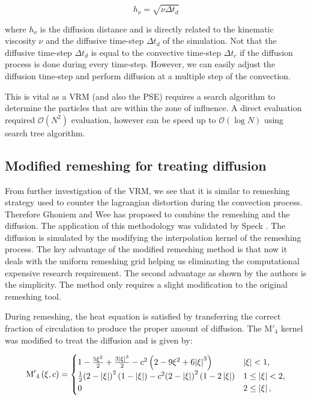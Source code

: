 	\begin{equation}
	h_{\nu} = \sqrt{\nu\Delta t_d}
	\end{equation}

where $h_{\nu}$ is the diffusion distance and is directly related to the kinematic viscosity $\nu$ and the diffusive time-step $\Delta t_d$ of the simulation. Not that the diffusive time-step $\Delta t_d$ is equal to the convective time-step $\Delta t_c$ if the diffusion process is done during every time-step. However, we can easily adjust the diffusion time-step and perform diffusion at a multiple step of the convection.

This is vital as a VRM (and also the PSE) requires a search algorithm to determine the particles that are within the zone of influence. A direct evaluation required $\mathcal{O}\left(N^2\right)$ evaluation, however can be speed up to $\mathcal{O}\left(\log N\right)$ using search tree algorithm.

\subsection{Modified remeshing for treating diffusion}
From further investigation of the VRM, we see that it is similar to remeshing strategy used to counter the lagrangian distortion during the convection process. Therefore Ghoniem and Wee \cite{Wee2006} has proposed to combine the remeshing and the diffusion. The application of this methodology was validated by Speck \cite{Speck2011a}. The diffusion is simulated by the modifying the interpolation kernel of the remeshing process. The key advantage of the modified remeshing method is that now it deals with the uniform remeshing grid helping us eliminating the computational expensive research requirement. The second advantage as shown by the authors is the simplicity. The method only requires a slight modification to the original remeshing tool.

During remeshing, the heat equation is satisfied by transferring the correct fraction of circulation to produce the proper amount of diffusion. The $\mathrm{M'}_4$ kernel was modified to treat the diffusion and is given by: 

\begin{equation}
{{{\rm{M'}}}_4}\left( {\xi ,c} \right) =
  \begin{cases}
   {1 - \frac{{5{\xi ^2}}}{2} + \frac{{3{{\left| \xi  \right|}^3}}}{2} - {c^2}\left( {2 - 9{\xi ^2} + 6{{\left| \xi  \right|}^3}} \right)} & {\left| \xi \right|} < 1, \\
   \frac{1}{2}{\left( {2 - \left| \xi  \right|} \right)^2}\left( {1 - \left| \xi  \right|} \right) - {c^2}{\left( {2 - \left| \xi  \right|} \right)^2}\left( {1 - 2\left| \xi  \right|} \right) & 1 \le {\left| \xi \right|} < 2,\\
   0 & 2 \le \left| \xi \right|,
  \end{cases}
\label{eq:modInterpKernel}
\end{equation}

